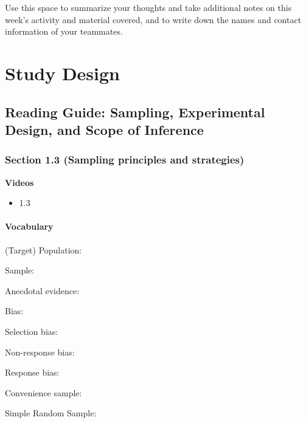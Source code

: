 \documentclass[
]{report}
\providecommand{\tightlist}{%
  \setlength{\itemsep}{0pt}\setlength{\parskip}{0pt}}
\newcommand{\rgs}{\vspace{12pt}} %
\newcommand{\rgi}{\hspace{24pt}}  %
\begin{document}
Use this space to summarize your thoughts and take additional notes on this week's activity and material covered, and to write down the names and contact information of your teammates.

\hypertarget{study-design}{%
\chapter{Study Design}\label{study-design}}

\hypertarget{reading-guide-sampling-experimental-design-and-scope-of-inference}{%
\section{Reading Guide: Sampling, Experimental Design, and Scope of Inference}\label{reading-guide-sampling-experimental-design-and-scope-of-inference}}

\hypertarget{section-1.3-sampling-principles-and-strategies}{%
\subsection*{Section 1.3 (Sampling principles and strategies)}\label{section-1.3-sampling-principles-and-strategies}}

\textbf{Videos}

\begin{itemize}
\tightlist
\item
  1.3
\end{itemize}


\hypertarget{vocabulary-1}{%
\subsubsection*{Vocabulary}\label{vocabulary-1}}

(Target) Population:
\rgs

Sample:
\rgs

Anecdotal evidence:
\rgs

Bias:
\rgs

\rgi Selection bias:
\rgs

\rgi Non-response bias:
\rgs

\rgi Response bias:
\rgs

Convenience sample:
\rgs

Simple Random Sample:
\rgs
\end{document}
